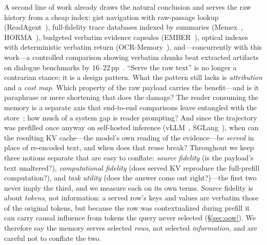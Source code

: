 \documentclass{article} %
\newcommand{\pp}{\,\mathrm{pp}}
\begin{document}
A second line of work already draws the natural conclusion and serves the raw
history from a cheap index: gist navigation with raw-passage lookup
(ReadAgent~\citep{readagent}), full-fidelity trace databases indexed by summaries
(Memex~\citep{memexrl}, HORMA~\citep{horma}), budgeted verbatim evidence capsules
(EMBER~\citep{ember}), optical indexes with deterministic verbatim return
(OCR-Memory~\citep{ocrmemory}), and---concurrently with this work---a controlled
comparison showing verbatim chunks beat extracted artifacts on dialogue benchmarks
by $16$--$22\pp$~\citep{verbatimchunks}. ``Serve the raw text'' is no longer a
contrarian stance; it is a design pattern. What the pattern still lacks is
\emph{attribution} and a \emph{cost map}. Which property of the raw payload carries
the benefit---and is it paraphrase or mere shortening that does the damage? The
reader consuming the memory is a separate axis that end-to-end comparisons leave
entangled with the store~\citep{memdelta}; how much of a system gap is reader
prompting? And since the trajectory was prefilled once anyway on self-hosted
inference (vLLM~\citep{vllm}, SGLang~\citep{sglang}), when can the resulting KV
cache---the model's own reading of the evidence---be \emph{served} in place of
re-encoded text, and when does that reuse break? Throughout we keep three notions
separate that are easy to conflate: \emph{source fidelity} (is the payload's text
unaltered?), \emph{computational fidelity} (does served KV reproduce the
full-prefill computation?), and \emph{task utility} (does the answer come out
right?)---the first two never imply the third, and we measure each on its own
terms. Source fidelity is about \emph{tokens}, not information: a served row's keys and
values are verbatim those of the original tokens, but because the row was contextualized
during prefill it can carry causal influence from tokens the query never selected
(\S\ref{sec:oow}). We therefore say the memory serves selected \emph{rows}, not selected
\emph{information}, and are careful not to conflate the two.
\end{document}
